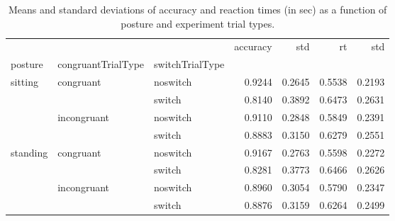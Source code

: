 \begin{table}
\centering
\caption{Means and standard deviations of accuracy and reaction times (in sec) as a function of posture and experiment trial types.}
\label{table-task-switching-replication-reaction-time}
\begin{tabular}{lllrrrr}
\toprule
         &             &        & accuracy &    std &     rt &    std \\
posture & congruantTrialType & switchTrialType &          &        &        &        \\
\midrule
sitting & congruant & noswitch &   0.9244 & 0.2645 & 0.5538 & 0.2193 \\
         &             & switch &   0.8140 & 0.3892 & 0.6473 & 0.2631 \\
         & incongruant & noswitch &   0.9110 & 0.2848 & 0.5849 & 0.2391 \\
         &             & switch &   0.8883 & 0.3150 & 0.6279 & 0.2551 \\
standing & congruant & noswitch &   0.9167 & 0.2763 & 0.5598 & 0.2272 \\
         &             & switch &   0.8281 & 0.3773 & 0.6466 & 0.2626 \\
         & incongruant & noswitch &   0.8960 & 0.3054 & 0.5790 & 0.2347 \\
         &             & switch &   0.8876 & 0.3159 & 0.6264 & 0.2499 \\
\bottomrule
\end{tabular}
\end{table}

